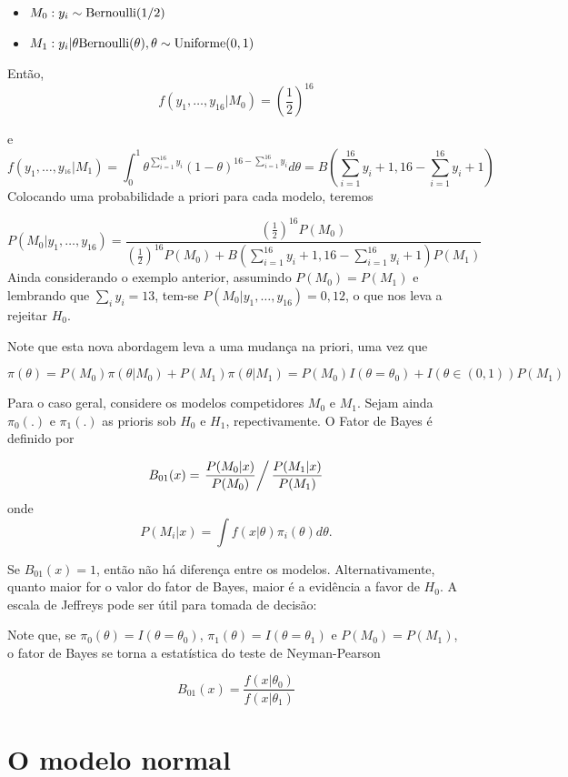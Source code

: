 \documentclass[
  letterpaper,
  DIV=11,
  numbers=noendperiod]{scrreprt}
\theoremstyle{plain}
\theoremstyle{definition}
\theoremstyle{definition}
\theoremstyle{remark}
\begin{document}
\begin{itemize}
\item
  \(M_0: y_i\sim\hbox{Bernoulli}(1/2)\)
\item
  \(M_1: y_i|\theta\hbox{Bernoulli}(\theta), \theta\sim\hbox{Uniforme}(0,1)\)
\end{itemize}

Então, \[f(y_1,\ldots,y_{16}|M_0)=\left(\frac{1}{2}\right)^{16}\]

e
\[f(y_1,\ldots,y_{^16}|M_1)=\int_0^1\theta^{\sum_{i=1}^{16}y_i}(1-\theta)^{16-\sum_{i=1}^{16}y_i}d\theta=B\left(\sum_{i=1}^{16}y_i+1,16-\sum_{i=1}^{16}y_i+1\right)\]
Colocando uma probabilidade a priori para cada modelo, teremos

\[P(M_0|y_1,\ldots,y_{16})=\frac{\left(\frac{1}{2}\right)^{16}P(M_0)}{\left(\frac{1}{2}\right)^{16}P(M_0)+B\left(\sum_{i=1}^{16}y_i+1,16-\sum_{i=1}^{16}y_i+1\right)P(M_1)}\]
Ainda considerando o exemplo anterior, assumindo \(P(M_0)=P(M_1)\) e
lembrando que \(\sum_i y_i=13\), tem-se
\(P(M_0|y_1,\ldots,y_{16})=0,12\), o que nos leva a rejeitar \(H_0\).

Note que esta nova abordagem leva a uma mudança na priori, uma vez que

\[\pi(\theta)=P(M_0)\pi(\theta|M_0)+P(M_1)\pi(\theta|M_1)=P(M_0)I(\theta=\theta_0)+I(\theta\in (0,1))P(M_1)\]

Para o caso geral, considere os modelos competidores \(M_0\) e \(M_1\).
Sejam ainda \(\pi_0(.)\) e \(\pi_1(.)\) as prioris sob \(H_0\) e
\(H_1\), repectivamente. O Fator de Bayes é definido por

\[B_{01}(x)=\left.\frac{P(M_0|x)}{P(M_0)}\right/ \frac{P(M_1|x)}{P(M_1)}\]
onde \[P(M_i|x)=\int f(x|\theta)\pi_i(\theta)d\theta.\]

Se \(B_{01}(x)=1\), então não há diferença entre os modelos.
Alternativamente, quanto maior for o valor do fator de Bayes, maior é a
evidência a favor de \(H_0\). A escala de Jeffreys pode ser útil para
tomada de decisão:

Note que, se \(\pi_0(\theta)=I(\theta=\theta_0)\),
\(\pi_1(\theta)=I(\theta=\theta_1)\) e \(P(M_0)=P(M_1)\), o fator de
Bayes se torna a estatística do teste de Neyman-Pearson

\[B_{01}(x)=\frac{f(x|\theta_0)}{f(x|\theta_1)}\]


\chapter{O modelo normal}\label{o-modelo-normal}
\end{document}
